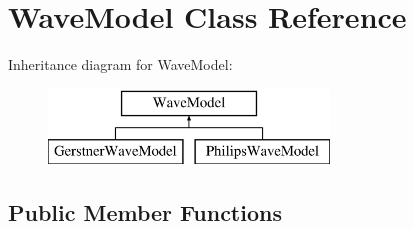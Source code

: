 \hypertarget{class_wave_model}{}\section{Wave\+Model Class Reference}
\label{class_wave_model}
Inheritance diagram for Wave\+Model\+:\begin{figure}[H]
\begin{center}
\leavevmode
\includegraphics[height=2.000000cm]{class_wave_model}
\end{center}
\end{figure}
\subsection*{Public Member Functions}
